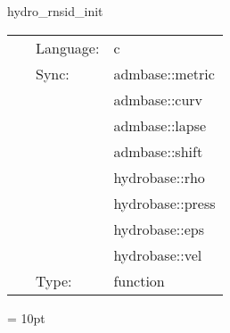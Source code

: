 \hspace{5mm} hydro\_rnsid\_init 

\hspace{5mm}{\it create rotating neutron star initial data } 


\hspace{5mm}

 \begin{tabular*}{160mm}{cll} 
~ & Language:  & c \\ 
~ & Sync:  & admbase::metric \\ 
~& ~ &admbase::curv\\ 
~& ~ &admbase::lapse\\ 
~& ~ &admbase::shift\\ 
~& ~ &hydrobase::rho\\ 
~& ~ &hydrobase::press\\ 
~& ~ &hydrobase::eps\\ 
~& ~ &hydrobase::vel\\ 
~ & Type:  & function \\ 
\end{tabular*} 



\vspace{5mm}\parskip = 10pt 
